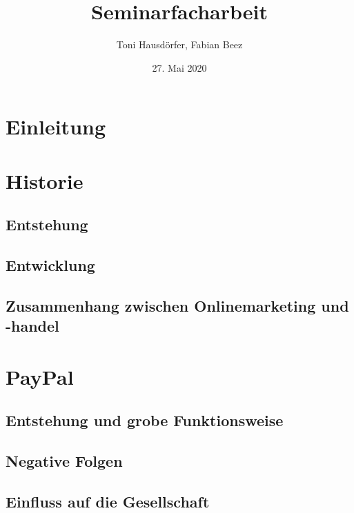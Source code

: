 \documentclass[a4paper, 12pt]{scrartcl}
\title{Seminarfacharbeit}
\author{Toni Hausdörfer, Fabian Beez}
\date{27. Mai 2020}
\begin{document}
    
    
    
    

    \tableofcontents 
        \newpage

    \section{Einleitung}
        
        \newpage
    
    
    
    \section{Historie}
            
        \subsection{Entstehung}
            
        \subsection{Entwicklung}
        \subsection{Zusammenhang zwischen Onlinemarketing und -handel}
        \newpage
        
        
        
    \section{PayPal}
		
        \subsection{Entstehung und grobe Funktionsweise}
            
        \subsection{Negative Folgen}
        \subsection{Einfluss auf die Gesellschaft}
        \newpage
        
\end{document}
